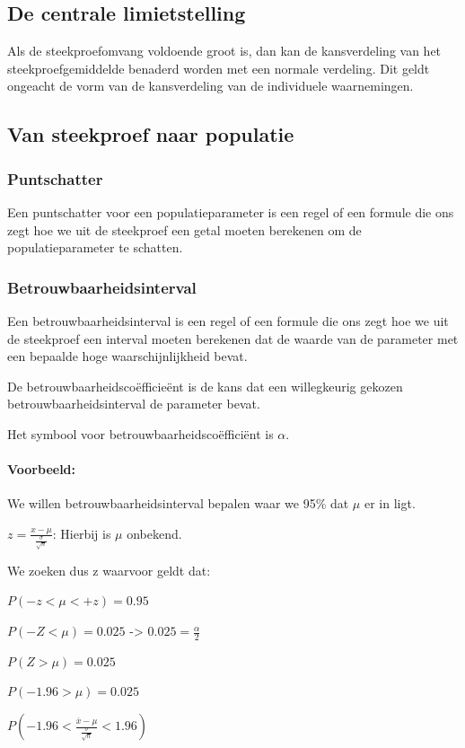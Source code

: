 \documentclass[a4paper,12pt]{article}
\begin{document}
\subsection{De centrale limietstelling}
Als de steekproefomvang voldoende groot is, dan kan de kansverdeling van het steekproefgemiddelde benaderd worden met een normale verdeling.
Dit geldt ongeacht de vorm van de kansverdeling van de individuele waarnemingen.

\subsection{Van steekproef naar populatie}
\subsubsection{Puntschatter}
Een puntschatter voor een populatieparameter is een regel of een formule die ons zegt hoe we uit de steekproef een getal moeten berekenen om de populatieparameter te schatten.

\subsubsection{Betrouwbaarheidsinterval}
Een betrouwbaarheidsinterval is een regel of een formule die ons zegt hoe we uit de steekproef een interval moeten berekenen dat de waarde van de parameter met een bepaalde hoge waarschijnlijkheid bevat.

De betrouwbaarheidscoëfficieënt is de kans dat een willegkeurig gekozen betrouwbaarheidsinterval de parameter bevat.

Het symbool voor betrouwbaarheidscoëfficiënt is $\alpha$.

\paragraph{Voorbeeld:}

We willen betrouwbaarheidsinterval bepalen waar we 95\% dat $\mu$ er in ligt.

$z = \frac{x - \mu}{\frac{\sigma}{\sqrt{n}}}$: Hierbij is $\mu$ onbekend.

We zoeken dus z waarvoor geldt dat:

$P(-z < \mu < +z) = 0.95$

$P(-Z < \mu) = 0.025$ -> $ 0.025 = \frac{\alpha}{2}$

$P(Z > \mu) = 0.025$

$P(-1.96 > \mu) = 0.025$

$P(-1.96 < \frac{\overline{x} - \mu}{\frac{\sigma}{\sqrt{n}}} <1.96)$
\end{document}
